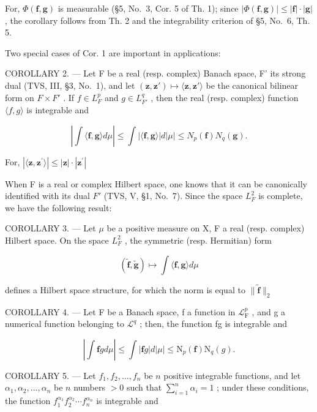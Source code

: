 For, \(\Phi(\mathbf{f},\mathbf{g})\) is measurable (§5, No.~3, Cor. 5 of Th. 1); since \(|\Phi(\mathbf{f},\mathbf{g})| \leqslant |\mathbf{f}| \cdot |\mathbf{g}|\) , the corollary follows from Th. 2 and the integrability criterion of §5, No.~6, Th. 5.

Two special cases of Cor. 1 are important in applications:

COROLLARY 2. --- Let F be a real (resp. complex) Banach space, F' its strong dual (TVS, III, §3, No.~1), and let \((\mathbf{z}, \mathbf{z}') \mapsto \langle \mathbf{z}, \mathbf{z}' \rangle\) be the canonical bilinear form on \(F \times F'\) . If \(f \in L_{F}^{p}\) and \(g \in L_{F'}^{q}\) , then the real (resp. complex) function \(\langle f, g \rangle\) is integrable and

\[
\left| \int \langle \mathbf {f}, \mathbf {g} \rangle d \mu \right| \leqslant \int | \langle \mathbf {f}, \mathbf {g} \rangle | d | \mu | \leqslant N _ {p} (\mathbf {f}) N _ {q} (\mathbf {g}).\tag{6}
\]

For, \(|\langle \mathbf{z},\mathbf{z}^{\prime}\rangle |\leqslant |\mathbf{z}|\cdot |\mathbf{z}^{\prime}|\)

When F is a real or complex Hilbert space, one knows that it can be canonically identified with its dual \(F'\) (TVS, V, §1, No.~7). Since the space \(L_{F}^{2}\) is complete, we have the following result:

COROLLARY 3. --- Let \(\mu\) be a positive measure on X, F a real (resp. complex) Hilbert space. On the space \(L_{F}^{2}\) , the symmetric (resp. Hermitian) form

\[
(\widetilde {\mathbf {f}}, \widetilde {\mathbf {g}}) \mapsto \int \langle \mathbf {f}, \mathbf {g} \rangle d \mu
\]

defines a Hilbert space structure, for which the norm is equal to \(\| \widetilde{\mathbf{f}}\| _2\)

COROLLARY 4. --- Let F be a Banach space, f a function in \(\mathcal{L}_{\mathrm{F}}^{p}\) , and g a numerical function belonging to \(\mathcal{L}^q\) ; then, the function fg is integrable and

\[
\left| \int \mathbf {f} g d \mu \right| \leqslant \int | \mathbf {f} g | d | \mu | \leqslant \mathrm{N} _ {p} (\mathbf {f}) \mathrm{N} _ {q} (g).\tag{7}
\]

COROLLARY 5. --- Let \(f_1, f_2, \ldots, f_n\) be \(n\) positive integrable functions, and let \(\alpha_1, \alpha_2, \ldots, \alpha_n\) be \(n\) numbers \(> 0\) such that \(\sum_{i=1}^{n} \alpha_i = 1\) ; under these conditions, the function \(f_1^{\alpha_1} f_2^{\alpha_2} \cdots f_n^{\alpha_n}\) is integrable and

